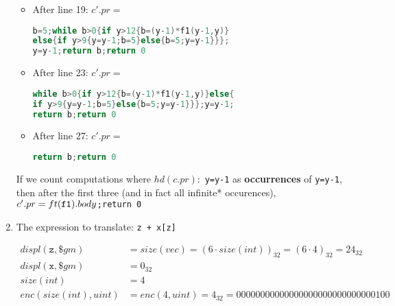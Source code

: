 \documentclass{article}
\begin{document}
\begin{enumerate}
{            \begin{itemize}
                \item {After line 19: $c'.pr = $
					\
					\begin{minipage}{0.5\linewidth}
						\begin{lstlisting}[language=c,numbers=none,frame=single]
b=5;while b>0{if y>12{b=(y-1)*f1(y-1,y)}
else{if y>9{y=y-1;b=5}else{b=5;y=y-1}}};
y=y-1;return b;return 0
\end{lstlisting}
					\end{minipage}
				}
                \item {After line 23: $c'.pr = $
				\
				\begin{minipage}{0.5\linewidth}
					\begin{lstlisting}[language=c,numbers=none,frame=single]
while b>0{if y>12{b=(y-1)*f1(y-1,y)}else{
if y>9{y=y-1;b=5}else{b=5;y=y-1}}};y=y-1;
return b;return 0
\end{lstlisting}
				\end{minipage}
				}
                \item {After line 27: $c'.pr = $
					\ \begin{minipage}{0.5\linewidth}
						\begin{lstlisting}[language=c,numbers=none,frame=single]
return b;return 0\end{lstlisting}
					\end{minipage}
				}
            \end{itemize}

			If we count computations where $hd(c.pr):$ \verb|y=y-1| as \textbf{occurrences} of \verb|y=y-1|, then after the first three (and in fact all infinite* occurences), $c'.pr=ft(\verb|f1|).body$\verb|;return 0|
        }
        \pagebreak \item {
            The expression to translate: \verb|z + x[z]|

            \begin{displaymath}
                \begin{aligned}
                    displ(\texttt{z}, \$gm) &= size(vec) = (6 \cdot size(int))_{32} = (6 \cdot 4)_{32} = 24_{32} \\
                    displ(\texttt{x}, \$gm) &= 0_{32} \\
					size(int) &= 4 \\
					enc(size(int),uint) &= enc(4,uint) = 4_{32} = 00000000000000000000000000000100
                \end{aligned}
            \end{displaymath}

}
\end{enumerate}
\end{document}
